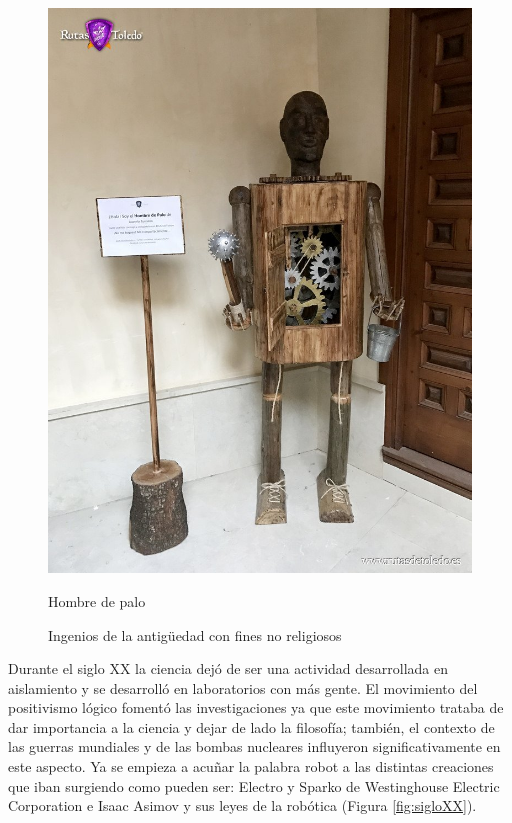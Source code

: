 \begin{figure}[ht!]
\begin{minipage}{0.3\linewidth}
		\includegraphics[width=\linewidth]{figs/hombre-palo.jpg}
		\caption*{\centering Hombre de palo \cite{hombredepalo_leyendasdetoledo}}
	\end{minipage}
	\caption{Ingenios de la antigüedad con fines no religiosos}
    \label{fig:ancient}
    \end{figure}

Durante el siglo XX la ciencia dejó de ser una actividad desarrollada en aislamiento y se desarrolló en laboratorios con más gente. El movimiento del positivismo lógico fomentó las investigaciones ya que este movimiento trataba de dar importancia a la ciencia y dejar de lado la filosofía; también, el contexto de las guerras mundiales y de las bombas nucleares influyeron significativamente en este aspecto. Ya se empieza a acuñar la palabra robot a las distintas creaciones que iban surgiendo como pueden ser: Electro y Sparko de Westinghouse Electric Corporation e Isaac Asimov y sus leyes de la robótica (Figura \ref{fig:sigloXX}).\\

